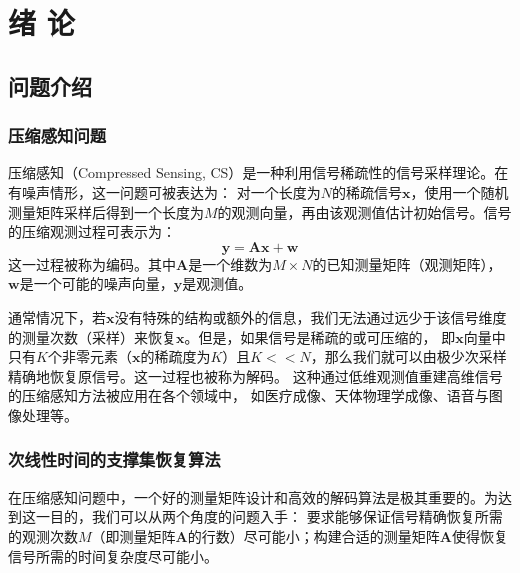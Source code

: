 \documentclass[AutoFakeBold]{LZUThesis}
\begin{document}
\mainmatter

\chapter{\texorpdfstring{绪 \quad 论}{绪论}}



\section{问题介绍}

\subsection{压缩感知问题}

压缩感知（Compressed Sensing, CS）\cite{1614066}是一种利用信号稀疏性的信号采样理论。在有噪声情形，这一问题可被表达为：
对一个长度为$N$的稀疏信号$\mathbf{x}$，使用一个随机测量矩阵采样后得到一个长度为$M$的观测向量，再由该观测值估计初始信号。信号的压缩观测过程可表示为：
\begin{equation}
    \mathbf{y} = \mathbf{Ax} + \mathbf{w}
\end{equation}
这一过程被称为编码。其中$\mathbf{A}$是一个维数为$M \times N$的已知测量矩阵（观测矩阵），$\mathbf{w}$是一个可能的噪声向量，$\mathbf{y}$是观测值。

通常情况下，若$\mathbf{x}$没有特殊的结构或额外的信息，我们无法通过远少于该信号维度的测量次数（采样）来恢复$\mathbf{x}$。但是，如果信号是稀疏的或可压缩的，
即$\mathbf{x}$向量中只有$K$个非零元素（$\mathbf{x}$的稀疏度为$K$）且$K << N$，那么我们就可以由极少次采样精确地恢复原信号。这一过程也被称为解码。
这种通过低维观测值重建高维信号的压缩感知方法被应用在各个领域中，
如医疗成像\cite{PMID:17969013}、天体物理学成像\cite{Wiaux_2009}、语音与图像处理\cite{elad2010sparse}等。

\subsection{次线性时间的支撑集恢复算法}

在压缩感知问题中，一个好的测量矩阵设计和高效的解码算法是极其重要的。为达到这一目的，我们可以从两个角度的问题入手：
要求能够保证信号精确恢复所需的观测次数$M$（即测量矩阵$\mathbf{A}$的行数）尽可能小；构建合适的测量矩阵$\mathbf{A}$使得恢复信号所需的时间复杂度尽可能小。
\end{document}
